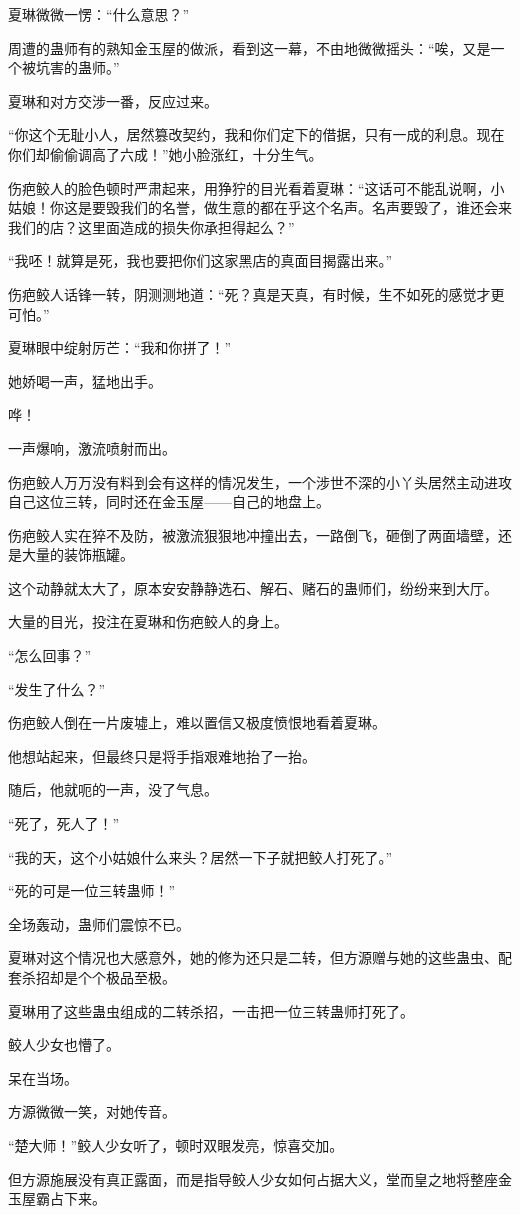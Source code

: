 \begin{this_body}
夏琳微微一愣：“什么意思？”

周遭的蛊师有的熟知金玉屋的做派，看到这一幕，不由地微微摇头：“唉，又是一个被坑害的蛊师。”

夏琳和对方交涉一番，反应过来。

“你这个无耻小人，居然篡改契约，我和你们定下的借据，只有一成的利息。现在你们却偷偷调高了六成！”她小脸涨红，十分生气。

伤疤鲛人的脸色顿时严肃起来，用狰狞的目光看着夏琳：“这话可不能乱说啊，小姑娘！你这是要毁我们的名誉，做生意的都在乎这个名声。名声要毁了，谁还会来我们的店？这里面造成的损失你承担得起么？”

“我呸！就算是死，我也要把你们这家黑店的真面目揭露出来。”

伤疤鲛人话锋一转，阴测测地道：“死？真是天真，有时候，生不如死的感觉才更可怕。”

夏琳眼中绽射厉芒：“我和你拼了！”

她娇喝一声，猛地出手。

哗！

一声爆响，激流喷射而出。

伤疤鲛人万万没有料到会有这样的情况发生，一个涉世不深的小丫头居然主动进攻自己这位三转，同时还在金玉屋——自己的地盘上。

伤疤鲛人实在猝不及防，被激流狠狠地冲撞出去，一路倒飞，砸倒了两面墙壁，还是大量的装饰瓶罐。

这个动静就太大了，原本安安静静选石、解石、赌石的蛊师们，纷纷来到大厅。

大量的目光，投注在夏琳和伤疤鲛人的身上。

“怎么回事？”

“发生了什么？”

伤疤鲛人倒在一片废墟上，难以置信又极度愤恨地看着夏琳。

他想站起来，但最终只是将手指艰难地抬了一抬。

随后，他就呃的一声，没了气息。

“死了，死人了！”

“我的天，这个小姑娘什么来头？居然一下子就把鲛人打死了。”

“死的可是一位三转蛊师！”

全场轰动，蛊师们震惊不已。

夏琳对这个情况也大感意外，她的修为还只是二转，但方源赠与她的这些蛊虫、配套杀招却是个个极品至极。

夏琳用了这些蛊虫组成的二转杀招，一击把一位三转蛊师打死了。

鲛人少女也懵了。

呆在当场。

方源微微一笑，对她传音。

“楚大师！”鲛人少女听了，顿时双眼发亮，惊喜交加。

但方源施展没有真正露面，而是指导鲛人少女如何占据大义，堂而皇之地将整座金玉屋霸占下来。

\end{this_body}

